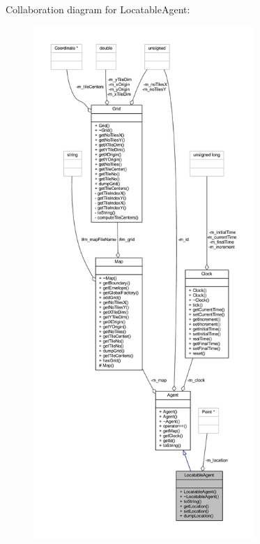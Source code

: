 Collaboration diagram for Locatable\+Agent\+:
\nopagebreak
\begin{figure}[H]
\begin{center}
\leavevmode
\includegraphics[height=550pt]{class_locatable_agent__coll__graph}
\end{center}
\end{figure}
